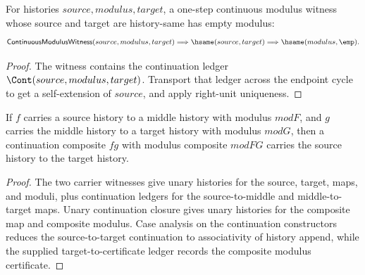 \begin{theorem}
\label{thm:continuous-modulus-witness-endpoint-cycle-modulus-empty}
For histories $source,modulus,target$, a one-step continuous modulus witness
whose source and target are history-same has empty modulus:
$$
\mathsf{ContinuousModulusWitness}(source,modulus,target)
\Longrightarrow \hsame(source,target)\Longrightarrow \hsame(modulus,\emp).
$$
\end{theorem}
\begin{proof}
The witness contains the continuation ledger
$\Cont(source,modulus,target)$. Transport that ledger across the endpoint
cycle to get a self-extension of $source$, and apply right-unit uniqueness.
\end{proof}

\begin{theorem}
\label{thm:continuous-function-carrier-comp-closed}
If $f$ carries a source history to a middle history with modulus $modF$, and
$g$ carries the middle history to a target history with modulus $modG$, then a
continuation composite $fg$ with modulus composite $modFG$ carries the source
history to the target history.
\end{theorem}
\begin{proof}
The two carrier witnesses give unary histories for the source, target, maps,
and moduli, plus continuation ledgers for the source-to-middle and
middle-to-target maps. Unary continuation closure gives unary histories for
the composite map and composite modulus. Case analysis on the continuation
constructors reduces the source-to-target continuation to associativity of
history append, while the supplied target-to-certificate ledger records the
composite modulus certificate.
\end{proof}

